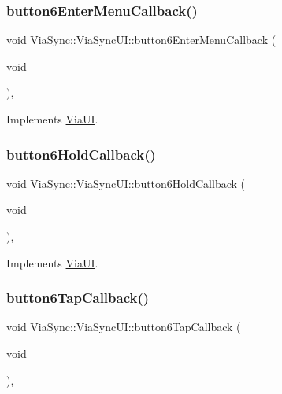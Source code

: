 \subsubsection{\texorpdfstring{button6\+Enter\+Menu\+Callback()}{button6EnterMenuCallback()}}
{\footnotesize\ttfamily void Via\+Sync\+::\+Via\+Sync\+U\+I\+::button6\+Enter\+Menu\+Callback (\begin{DoxyParamCaption}\item[{void}]{ }\end{DoxyParamCaption})\hspace{0.3cm}{\ttfamily [override]}, {\ttfamily [virtual]}}



Implements \mbox{\hyperlink{class_via_u_i_ae59e7ff3a6ba1f641a4a916e47a26513}{Via\+UI}}.

\mbox{\label{class_via_sync_1_1_via_sync_u_i_ace582870350424e071fc6ddb87efd802}} 
\subsubsection{\texorpdfstring{button6\+Hold\+Callback()}{button6HoldCallback()}}
{\footnotesize\ttfamily void Via\+Sync\+::\+Via\+Sync\+U\+I\+::button6\+Hold\+Callback (\begin{DoxyParamCaption}\item[{void}]{ }\end{DoxyParamCaption})\hspace{0.3cm}{\ttfamily [override]}, {\ttfamily [virtual]}}



Implements \mbox{\hyperlink{class_via_u_i_afa66f7946b6cf755b94383715b26a651}{Via\+UI}}.

\mbox{\label{class_via_sync_1_1_via_sync_u_i_a553dc53213d1b4b62d7aead58533c511}} 
\subsubsection{\texorpdfstring{button6\+Tap\+Callback()}{button6TapCallback()}}
{\footnotesize\ttfamily void Via\+Sync\+::\+Via\+Sync\+U\+I\+::button6\+Tap\+Callback (\begin{DoxyParamCaption}\item[{void}]{ }\end{DoxyParamCaption})\hspace{0.3cm}{\ttfamily [override]}, {\ttfamily [virtual]}}



